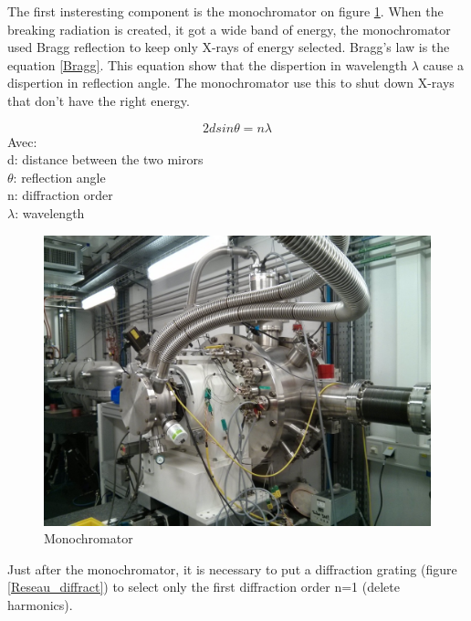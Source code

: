 \documentclass[11pt,a4paper,oneside]{article}
\begin{document}
The first insteresting component is the monochromator on figure \ref{monochromateur}. When the breaking radiation is created, it got a wide band of energy, the monochromator used Bragg reflection to keep only X-rays of energy selected. Bragg's law is the equation \ref{Bragg}. This equation show that the dispertion in wavelength $\lambda$ cause a dispertion in reflection angle. The monochromator use this to shut down X-rays that don't have the right energy.

\begin{equation}
    2d sin \theta = n \lambda  \label{Bragg}
\end{equation}
Avec:\\
d: distance between the two mirors\\
$\theta$: reflection angle\\
n: diffraction order\\
$\lambda$: wavelength\\
\medskip
\begin{figure}[H]
    \begin{center}
        \includegraphics[scale=0.13]{Images/IMG_20151210_202721.jpg}
        \caption{Monochromator}
        \label{monochromateur}
    \end{center}
\end{figure}
\medskip

Just after the monochromator, it is necessary to put a diffraction grating (figure \ref{Reseau_diffract}) to select only the first diffraction order n=1 (delete harmonics).
\end{document}
